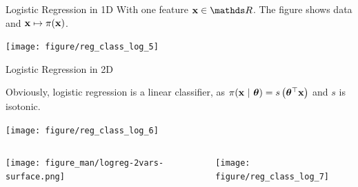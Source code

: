 \documentclass[11pt,compress,t,notes=noshow, xcolor=table]{beamer}
\begin{document}
\begin{vbframe}{Logistic Regression in 1D}
With one feature $\xv \in \R$. The figure shows data and $\mathbf{x} \mapsto \pi(\mathbf{x})$.

\begin{knitrout}\scriptsize
{}\color{fgcolor}

{\centering \texttt{[image: figure/reg\_class\_log\_5]} 

}

\end{knitrout}
\end{vbframe}
\begin{vbframe}{Logistic Regression in 2D}

Obviously, logistic regression is a linear classifier, as $\pi(\mathbf{x}~|~ \bm{\theta}) = s\left( \bm{\theta}^\top \mathbf{x} \right)$ 
and $s$ is isotonic.

\lz
\begin{knitrout}\scriptsize
{}\color{fgcolor}

{\centering \texttt{[image: figure/reg\_class\_log\_6]}  

}

\end{knitrout}

\framebreak

\begin{columns}[T]
\begin{column}{0.5\textwidth}
  \texttt{[image: figure\_man/logreg-2vars-surface.png]}
\end{column}
\begin{column}{0.5\textwidth}
\begin{knitrout}\scriptsize
{}\color{fgcolor}

{\centering \texttt{[image: figure/reg\_class\_log\_7]} 

}

\end{knitrout}
\end{column}
\end{columns}

\end{vbframe}

\endlecture
\end{document}
